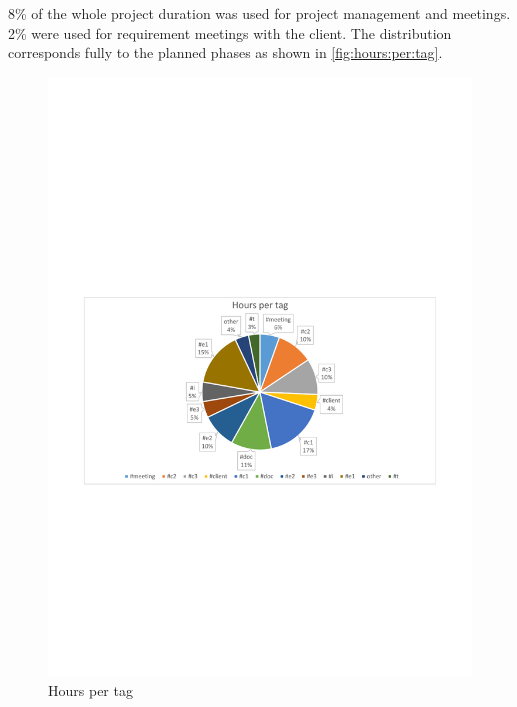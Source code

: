 8\% of the whole project duration was used for project management and meetings. 2\% were used for requirement meetings with the client.
The distribution corresponds fully to the planned phases as shown in \autoref{fig:hours:per:tag}.
\begin{figure}[]
	\includegraphics[trim=4cm 9.6cm 3.5cm 11.1cm, clip=true, width=\textwidth]{img/project_monitoring_hours_per_tag_diagram.pdf}
	\caption{Hours per tag}
	\label{fig:hours:per:tag}
\end{figure}


